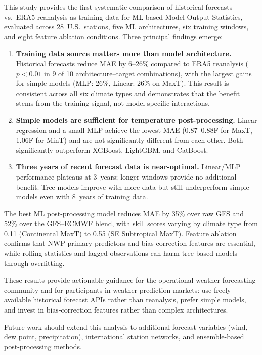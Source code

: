 \documentclass{ametsocV6.1}
\begin{document}
This study provides the first systematic comparison of historical forecasts vs.\
ERA5 reanalysis as training data for ML-based Model Output Statistics, evaluated
across 28~U.S.\ stations, five ML architectures, six training windows, and
eight feature ablation conditions. Three principal findings emerge:

\begin{enumerate}
  \item \textbf{Training data source matters more than model architecture.}
    Historical forecasts reduce MAE by 6--26\% compared to ERA5 reanalysis
    ($p < 0.01$ in 9 of 10 architecture--target combinations), with the
    largest gains for simple models (MLP: 26\%, Linear: 26\% on MaxT). This
    result is consistent across all six climate types and demonstrates that the
    benefit stems from the training signal, not model-specific interactions.
  \item \textbf{Simple models are sufficient for temperature post-processing.}
    Linear regression and a small MLP achieve the lowest MAE (0.87--0.88\textdegree{}F
    for MaxT, 1.06\textdegree{}F for MinT) and are not significantly different from
    each other. Both significantly outperform XGBoost, LightGBM, and CatBoost.
  \item \textbf{Three years of recent forecast data is near-optimal.}
    Linear/MLP performance plateaus at 3~years; longer windows provide no
    additional benefit. Tree models improve with more data but still underperform
    simple models even with 8~years of training data.
\end{enumerate}

The best ML post-processing model reduces MAE by 35\% over raw GFS and 52\% over
the GFS--ECMWF blend, with skill scores varying by climate type from 0.11
(Continental MaxT) to 0.55 (SE Subtropical MaxT). Feature ablation confirms that
NWP primary predictors and bias-correction features are essential, while rolling
statistics and lagged observations can harm tree-based models through overfitting.

These results provide actionable guidance for the operational weather forecasting
community and for participants in weather prediction markets: use freely available
historical forecast APIs rather than reanalysis, prefer simple models, and invest
in bias-correction features rather than complex architectures.

Future work should extend this analysis to additional forecast variables (wind,
dew point, precipitation), international station networks, and ensemble-based
post-processing methods.
\end{document}
